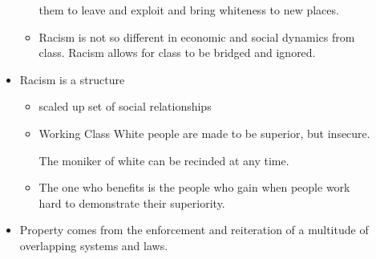 \documentclass{report}
\begin{document}
\begin{description}
\begin{itemize}
\begin{itemize}
                        them to leave and exploit and bring
                        whiteness to new places.
                    \item Racism is not so different in economic
                        and social dynamics from class. Racism
                        allows for class to be bridged and
                        ignored.
                \end{itemize}
            \item Racism is a structure
                \begin{itemize}
                    \item scaled up set of social relationships
                    \item Working Class White people are made
                        to be superior, but insecure.

                        The moniker of white can be recinded at
                        any time.
                    \item The one who benefits is the people who
                        gain when people work hard to demonstrate
                        their superiority.
                \end{itemize}
            \item Property comes from the enforcement and 
                reiteration of a multitude of overlapping
                systems and laws.
        \end{itemize}
\end{description}
\end{document}
